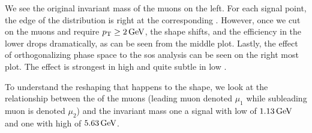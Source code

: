 We see the original invariant mass of the muons \mmumu on the left. For each signal point, the edge of the \mmumu distribution is right at the corresponding \dm. However, once we cut on the muons \pt and require $p_{\mathrm{T}}\geq 2\,\text{Ge\hspace{-.08em}V}$, the shape shifts, and the efficiency in the lower \dm drops dramatically, as can be seen from the middle plot. Lastly, the effect of orthogonalizing phase space to the \gls{sos} analysis can be seen on the right most plot. The effect is strongest in high \dm and quite subtle in low \dm. 

To understand the reshaping that happens to the \mmumu shape, we look at the relationship between the \pt of the muons (leading muon denoted $\mu_1$ while subleading muon is denoted $\mu_2$) and the invariant mass one a signal with low \dm of $1.13\,\text{Ge\hspace{-.08em}V}$ and one with high \dm of $5.63\,\text{Ge\hspace{-.08em}V}$.

